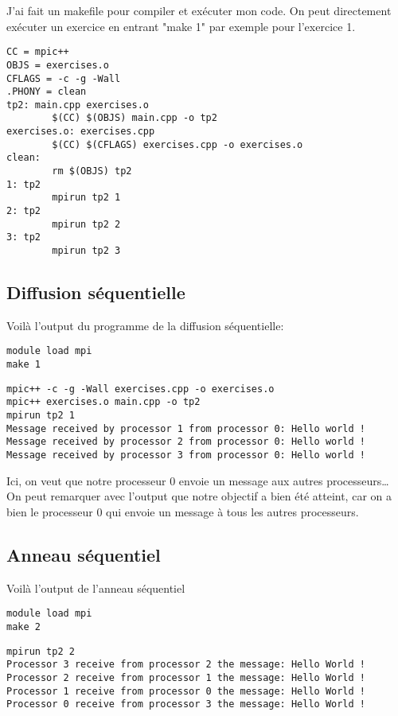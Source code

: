 \documentclass[11pt]{article}
\begin{document}
J'ai fait un makefile pour compiler et exécuter mon code. On peut directement exécuter un exercice en entrant "make 1" par exemple pour l'exercice 1.
\begin{verbatim}
CC = mpic++
OBJS = exercises.o
CFLAGS = -c -g -Wall
.PHONY = clean
tp2: main.cpp exercises.o
        $(CC) $(OBJS) main.cpp -o tp2
exercises.o: exercises.cpp
        $(CC) $(CFLAGS) exercises.cpp -o exercises.o
clean:
        rm $(OBJS) tp2
1: tp2
        mpirun tp2 1
2: tp2
        mpirun tp2 2
3: tp2
        mpirun tp2 3
\end{verbatim}
\subsection{Diffusion séquentielle}
\label{sec:org672931d}
Voilà l'output du programme de la diffusion séquentielle:
\begin{verbatim}
module load mpi
make 1
\end{verbatim}

\begin{verbatim}
mpic++ -c -g -Wall exercises.cpp -o exercises.o
mpic++ exercises.o main.cpp -o tp2
mpirun tp2 1
Message received by processor 1 from processor 0: Hello world !
Message received by processor 2 from processor 0: Hello world !
Message received by processor 3 from processor 0: Hello world !
\end{verbatim}


Ici, on veut que notre processeur 0 envoie un message aux autres processeurs\ldots{} On peut remarquer avec l'output que notre objectif a bien été atteint,
car on a bien le processeur 0 qui envoie un message à tous les autres processeurs.

\subsection{Anneau séquentiel}
\label{sec:org78cf21b}

Voilà l'output de l'anneau séquentiel

\begin{verbatim}
module load mpi
make 2
\end{verbatim}

\begin{verbatim}
mpirun tp2 2
Processor 3 receive from processor 2 the message: Hello World !
Processor 2 receive from processor 1 the message: Hello World !
Processor 1 receive from processor 0 the message: Hello World !
Processor 0 receive from processor 3 the message: Hello World !
\end{verbatim}
\end{document}
